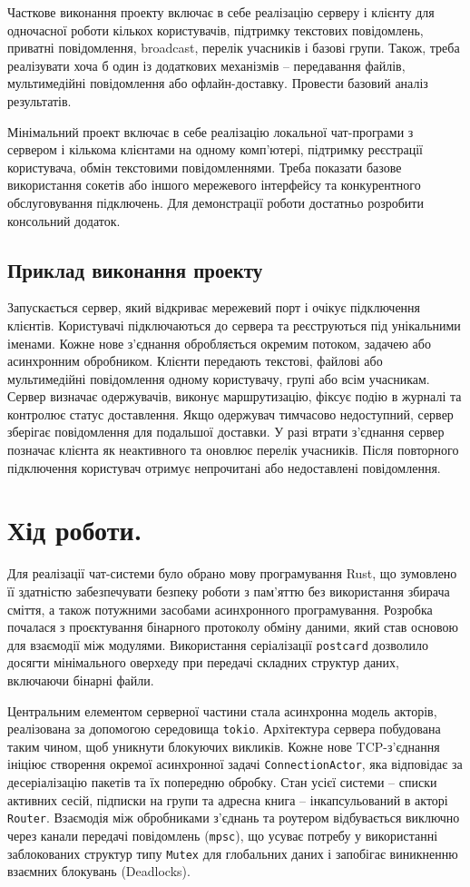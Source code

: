 \documentclass[14pt, a4paper]{extreport}
\begin{document}
	Часткове виконання проекту включає в себе реалізацію серверу і клієнту для одночасної роботи кількох користувачів, підтримку текстових повідомлень, приватні повідомлення, broadcast, перелік учасників і базові групи. Також, треба реалізувати хоча б один із додаткових механізмів -- передавання файлів, мультимедійні повідомлення або офлайн-доставку. Провести базовий аналіз результатів.
	
	Мінімальний проект включає в себе реалізацію локальної чат-програми з сервером і кількома клієнтами на одному комп'ютері, підтримку реєстрації користувача, обмін текстовими повідомленнями. Треба показати базове використання сокетів або іншого мережевого інтерфейсу та конкурентного обслуговування підключень. Для демонстрації роботи достатньо розробити консольний додаток.
	
	\subsection*{Приклад виконання проекту} Запускається сервер, який відкриває мережевий порт і очікує підключення клієнтів. Користувачі підключаються до сервера та реєструються під унікальними іменами. Кожне нове з'єднання обробляється окремим потоком, задачею або асинхронним обробником. Клієнти передають текстові, файлові або мультимедійні повідомлення одному користувачу, групі або всім учасникам. Сервер визначає одержувачів, виконує маршрутизацію, фіксує подію в журналі та контролює статус доставлення. Якщо одержувач тимчасово недоступний, сервер зберігає повідомлення для подальшої доставки. У разі втрати з'єднання сервер позначає клієнта як неактивного та оновлює перелік учасників. Після повторного підключення користувач отримує непрочитані або недоставлені повідомлення.
	
	\section*{Хід роботи.}
	
	Для реалізації чат-системи було обрано мову програмування Rust, що зумовлено її здатністю забезпечувати безпеку роботи з пам'яттю без використання збирача сміття, а також потужними засобами асинхронного програмування. Розробка почалася з проєктування бінарного протоколу обміну даними, який став основою для взаємодії між модулями. Використання серіалізації \texttt{postcard} дозволило досягти мінімального оверхеду при передачі складних структур даних, включаючи бінарні файли.
	
	Центральним елементом серверної частини стала асинхронна модель акторів, реалізована за допомогою середовища \texttt{tokio}. Архітектура сервера побудована таким чином, щоб уникнути блокуючих викликів. Кожне нове TCP-з'єднання ініціює створення окремої асинхронної задачі \texttt{ConnectionActor}, яка відповідає за десеріалізацію пакетів та їх попередню обробку. Стан усієї системи -- списки активних сесій, підписки на групи та адресна книга -- інкапсульований в акторі \texttt{Router}. Взаємодія між обробниками з'єднань та роутером відбувається виключно через канали передачі повідомлень (\texttt{mpsc}), що усуває потребу у використанні заблокованих структур типу \texttt{Mutex} для глобальних даних і запобігає виникненню взаємних блокувань (Deadlocks).
	
\end{document}
